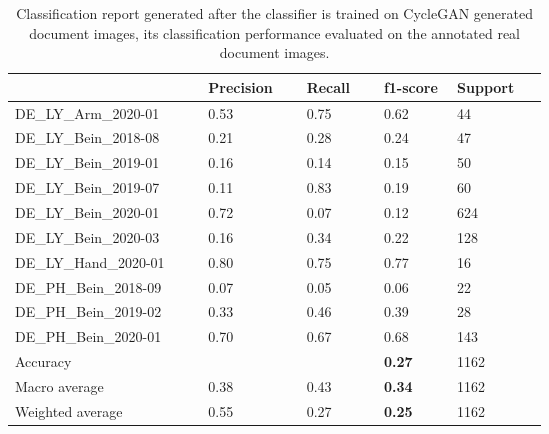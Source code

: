 \begin{center}
\begin{table}[H]
    \begin{center}
    \begin{tabular}{P{0.22\linewidth} P{0.10\linewidth} P{0.10\linewidth} P{0.10\linewidth} P{0.10\linewidth}} 
	        \toprule
            & Precision & Recall & f1-score & Support\\[0.0ex] 
        \midrule
        DE\_LY\_Arm\_2020-01 & 0.53 & 0.75 & 0.62 & 44\\[0.0ex]
        \midrule
        DE\_LY\_Bein\_2018-08 & 0.21 & 0.28 & 0.24 & 47\\[0.0ex]
        \midrule
        DE\_LY\_Bein\_2019-01 & 0.16 & 0.14 & 0.15 & 50\\[0.0ex]
        \midrule
        DE\_LY\_Bein\_2019-07 & 0.11 & 0.83 & 0.19 & 60\\[0.0ex]
        \midrule
        DE\_LY\_Bein\_2020-01 & 0.72 & 0.07 & 0.12 & 624\\[0.0ex]
        \midrule
        DE\_LY\_Bein\_2020-03 & 0.16 & 0.34 & 0.22 & 128\\[0.0ex]
        \midrule
        DE\_LY\_Hand\_2020-01 & 0.80 & 0.75 & 0.77 & 16\\[0.0ex]
        \midrule
        DE\_PH\_Bein\_2018-09 & 0.07 & 0.05 & 0.06 & 22\\[0.0ex]
        \midrule
        DE\_PH\_Bein\_2019-02 & 0.33 & 0.46 & 0.39 & 28\\[0.0ex]
        \midrule
        DE\_PH\_Bein\_2020-01 & 0.70 & 0.67 & 0.68 & 143\\[0.0ex]
        \midrule
        \midrule
        Accuracy              &      &      & \bf{0.27} & 1162\\[0.0ex]
        Macro average             & 0.38 & 0.43 &  \bf{0.34} & 1162\\[0.0ex]
        Weighted average          & 0.55 & 0.27 &  \bf{0.25} & 1162\\[0.0ex]
        \bottomrule
    \end{tabular}
    \caption[Classification report generated after the classifier is trained on \ac{CycleGAN} generated document images, its classification performance evaluated on the annotated real document images.]{Classification report generated after the classifier is trained on \ac{CycleGAN} generated document images, its classification performance evaluated on the annotated real document images.}
    \label{table:CycleGANClassificationReport}
    \end{center}
\end{table}
\end{center}





